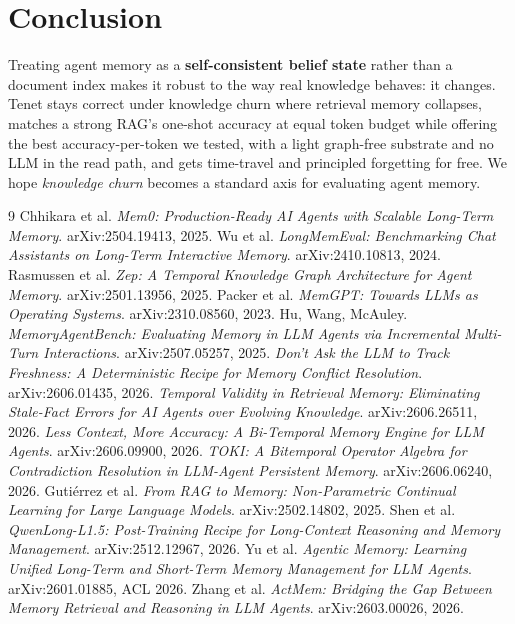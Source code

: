 \documentclass[11pt]{article}
\begin{document}
\section{Conclusion}
Treating agent memory as a \textbf{self-consistent belief state} rather than a document index
makes it robust to the way real knowledge behaves: it changes. Tenet stays correct under
knowledge churn where retrieval memory collapses, matches a strong RAG's one-shot accuracy at
equal token budget while offering the best accuracy-per-token we tested, with a light
graph-free substrate and no LLM in the read path, and gets time-travel and principled
forgetting for free. We hope \emph{knowledge churn} becomes a standard axis for
evaluating agent memory.

\begin{thebibliography}{9}\small
{} Chhikara et al. \emph{Mem0: Production-Ready AI Agents with Scalable Long-Term Memory}. arXiv:2504.19413, 2025.
 Wu et al. \emph{LongMemEval: Benchmarking Chat Assistants on Long-Term Interactive Memory}. arXiv:2410.10813, 2024.
 Rasmussen et al. \emph{Zep: A Temporal Knowledge Graph Architecture for Agent Memory}. arXiv:2501.13956, 2025.
 Packer et al. \emph{MemGPT: Towards LLMs as Operating Systems}. arXiv:2310.08560, 2023.
 Hu, Wang, McAuley. \emph{MemoryAgentBench: Evaluating Memory in LLM Agents via Incremental Multi-Turn Interactions}. arXiv:2507.05257, 2025.
 \emph{Don't Ask the LLM to Track Freshness: A Deterministic Recipe for Memory Conflict Resolution}. arXiv:2606.01435, 2026.
 \emph{Temporal Validity in Retrieval Memory: Eliminating Stale-Fact Errors for AI Agents over Evolving Knowledge}. arXiv:2606.26511, 2026.
 \emph{Less Context, More Accuracy: A Bi-Temporal Memory Engine for LLM Agents}. arXiv:2606.09900, 2026.
 \emph{TOKI: A Bitemporal Operator Algebra for Contradiction Resolution in LLM-Agent Persistent Memory}. arXiv:2606.06240, 2026.
 Guti\'errez et al. \emph{From RAG to Memory: Non-Parametric Continual Learning for Large Language Models}. arXiv:2502.14802, 2025.
 Shen et al. \emph{QwenLong-L1.5: Post-Training Recipe for Long-Context Reasoning and Memory Management}. arXiv:2512.12967, 2026.
 Yu et al. \emph{Agentic Memory: Learning Unified Long-Term and Short-Term Memory Management for LLM Agents}. arXiv:2601.01885, ACL 2026.
 Zhang et al. \emph{ActMem: Bridging the Gap Between Memory Retrieval and Reasoning in LLM Agents}. arXiv:2603.00026, 2026.

\end{thebibliography}
\end{document}
